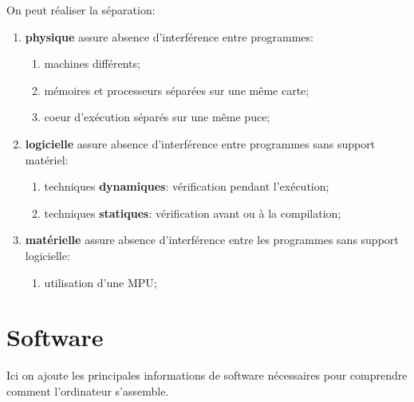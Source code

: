 \documentclass{article}
\begin{document}
On peut réaliser la séparation:
\begin{enumerate}[rightmargin = \leftmargin]
    \item \textbf{physique} assure absence d'interférence entre programmes:
    \begin{enumerate}[noitemsep]
        \item machines différents;
        \item mémoires et processeurs séparées sur une même carte;
        \item coeur d'exécution séparés sur une même puce;
    \end{enumerate}

    \item \textbf{logicielle} assure absence d'interférence entre programmes sans support matériel:
    \begin{enumerate}[noitemsep]
        \item techniques \textbf{dynamiques}: vérification pendant l'exécution;
        \item techniques \textbf{statiques}: vérification avant ou à la compilation;
    \end{enumerate}

    \item \textbf{matérielle} assure absence d'interférence entre les programmes sans support logicielle:
    \begin{enumerate}
        \item utilisation d'une MPU;
    \end{enumerate}
\end{enumerate}



\section{Software}

Ici on ajoute les principales informations de software nécessaires pour comprendre comment l'ordinateur s'assemble.
\end{document}
